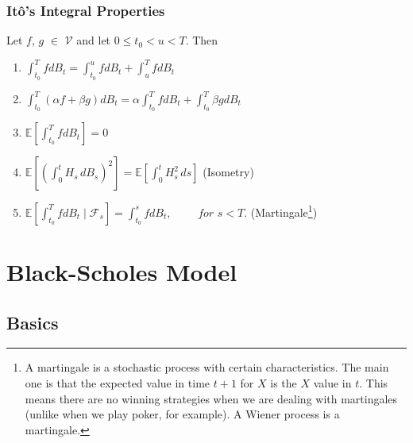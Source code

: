 \documentclass[12pt,twoside]{reedthesis}
\theoremstyle{definition}
\theoremstyle{definition}
\theoremstyle{remark}
\begin{document}
  \subsubsection{Itô's Integral
  Properties}\label{itos-integral-properties}
  
  Let \(f\), \(g\) \(\in\) \(\mathcal{V}\) and let \(0 \leq t_0 < u < T\).
  Then
  \begin{enumerate}[label=(\roman*)]
    \item $\displaystyle \int_{t_0}^{T}{f dB_t} = \int_{t_0}^{u}{f dB_t} + \int_{u}^{T}{f dB_t}$
    \item $\displaystyle \int_{t_0}^{T}{(\alpha f + \beta g) dB_t} = \alpha  \int_{t_0}^{T}{f dB_t} + \int_{t_0}^{T}{ \beta g dB_t}$
    \item $\displaystyle \mathbb{E}\left[ \int_{t_0}^{T}{fdB_t}\right] = 0 $
    \item $\displaystyle \mathbb {E} \left[\left(\int_{0}^{t}H_{s}\,dB_{s}\right)^{2}\right]=\mathbb {E} \left[\int _{0}^{t}H_{s}^{2}\,ds\right]$ (Isometry)
    \item $ \displaystyle \mathbb {E}\left[ \int_{t_0}^{T}{f dB_t \mid \mathcal{F}_{s}} \right] = \int_{t_0}^{s}{f dB_t}, \,\,\,\,\,\,\,\,\,\,\,\,\,\, for \,\, s < T.$  (Martingale\footnote{A martingale is a stochastic process with certain characteristics. The main one is that the expected value in time $t+1$ for $X$ is the $X$ value in $t$. This means there are no winning strategies when we are dealing with martingales (unlike when we play poker, for example). A Wiener process is a martingale.})
  \end{enumerate}
  \section{Black-Scholes Model}\label{black-scholes-model}
  
  \subsection{Basics}\label{basics}
  
\end{document}
